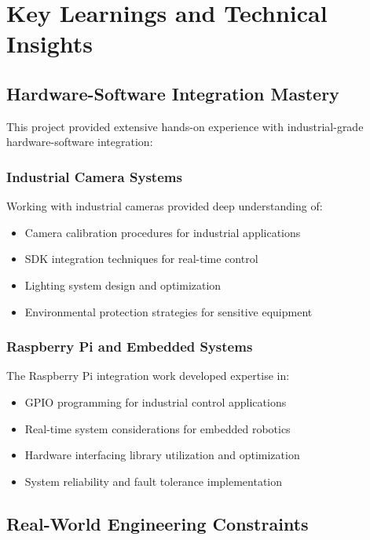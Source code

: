 \documentclass{book}
\begin{document}
\chapter{Key Learnings and Technical Insights}

\section{Hardware-Software Integration Mastery}

\par\noindent This project provided extensive hands-on experience with industrial-grade hardware-software integration:

\subsection{Industrial Camera Systems}
\par\noindent Working with industrial cameras provided deep understanding of:

\begin{itemize}
\item Camera calibration procedures for industrial applications
\item SDK integration techniques for real-time control
\item Lighting system design and optimization
\item Environmental protection strategies for sensitive equipment
\end{itemize}

\subsection{Raspberry Pi and Embedded Systems}
\par\noindent The Raspberry Pi integration work developed expertise in:

\begin{itemize}
\item GPIO programming for industrial control applications
\item Real-time system considerations for embedded robotics
\item Hardware interfacing library utilization and optimization
\item System reliability and fault tolerance implementation
\end{itemize}

\section{Real-World Engineering Constraints}
\end{document}

